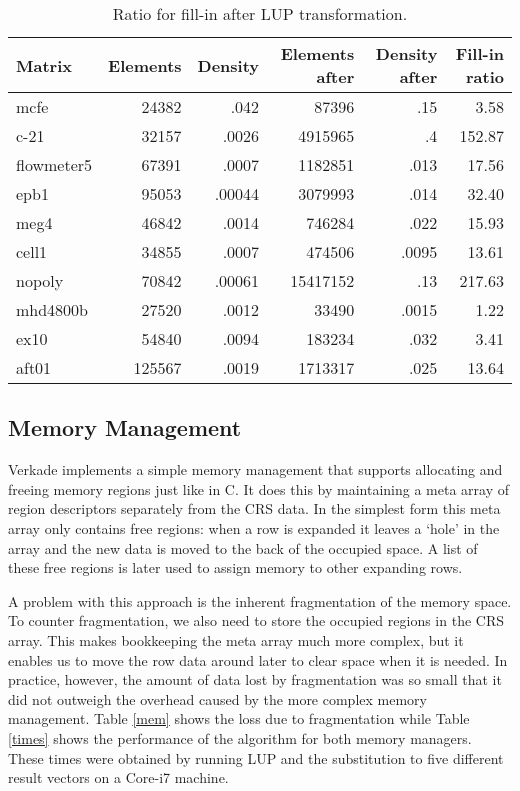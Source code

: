 \documentclass[10pt,a4paper]{article}
\begin{document}
\begin{table}
\begin{tabular}{|l|rr|rr|r|}
\hline 
Matrix & Elements & Density & Elements after & Density after & Fill-in ratio\\ 
\hline 
mcfe & 24382 & .042  & 87396 & .15 & 3.58  \\
c-21 &  32157 & .0026  & 4915965 & .4 & 152.87  \\ 
flowmeter5 & 67391 & .0007 & 1182851 & .013 & 17.56 \\ 
epb1 & 95053  & .00044  & 3079993 & .014 & 32.40 \\ 
meg4 & 46842 & .0014 & 746284 & .022 & 15.93 \\ 
cell1 & 34855  & .0007  & 474506  & .0095 & 13.61 \\ 
nopoly &  70842 & .00061  & 15417152 & .13 & 217.63 \\ 
mhd4800b & 27520  &  .0012 & 33490  & .0015 & 1.22\\ 
ex10 & 54840 &  .0094 & 183234 & .032 & 3.41\\ 
aft01 & 125567  & .0019  & 1713317 & .025 & 13.64\\ 
\hline 
\end{tabular} 
\label{fillin}
\caption{Ratio for fill-in after LUP transformation.}
\end{table}

\subsection{Memory Management}

Verkade implements a simple memory management that supports allocating and freeing memory regions just like in C. It does this by maintaining a meta array of region descriptors separately from the CRS data. In the simplest form this meta array only contains free regions: when a row is expanded it leaves a `hole' in the array and the new data is moved to the back of the occupied space. A list of these free regions is later used to assign memory to other expanding rows. 

A problem with this approach is the inherent fragmentation of the memory space. To counter fragmentation, we also need to store the occupied regions in the CRS array. This makes bookkeeping the meta array much more complex, but it enables us to move the row data around later to clear space when it is needed. In practice, however, the amount of data lost by fragmentation was so small that it did not outweigh the overhead caused by the more complex memory management. Table \ref{mem} shows the loss due to fragmentation while Table \ref{times} shows the performance of the algorithm for both memory managers. These times were obtained by running LUP and the substitution to five different result vectors on a Core-i7 machine.
\end{document}
